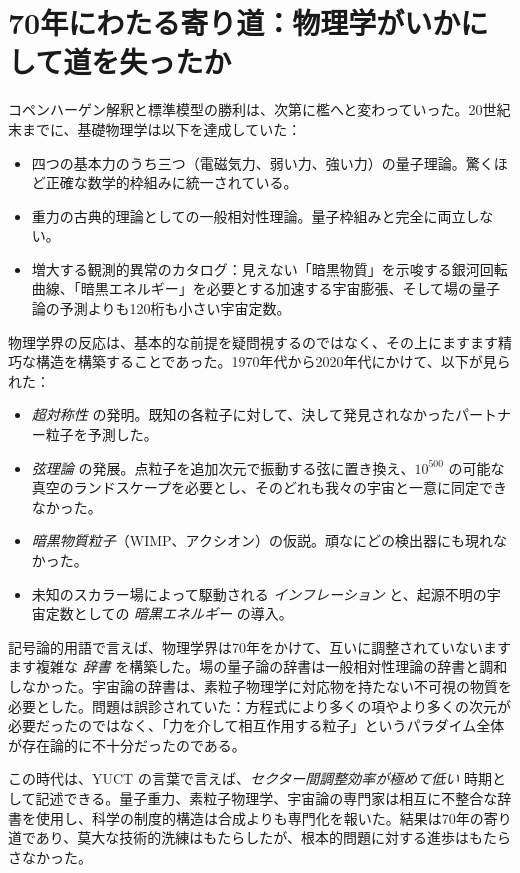 \documentclass[12pt,a4paper]{article}
\begin{document}
	\section{70年にわたる寄り道：物理学がいかにして道を失ったか}
	
	コペンハーゲン解釈と標準模型の勝利は、次第に檻へと変わっていった。20世紀末までに、基礎物理学は以下を達成していた：
	\begin{itemize}
		\item 四つの基本力のうち三つ（電磁気力、弱い力、強い力）の量子理論。驚くほど正確な数学的枠組みに統一されている。
		\item 重力の古典的理論としての一般相対性理論。量子枠組みと完全に両立しない。
		\item 増大する観測的異常のカタログ：見えない「暗黒物質」を示唆する銀河回転曲線、「暗黒エネルギー」を必要とする加速する宇宙膨張、そして場の量子論の予測よりも120桁も小さい宇宙定数。
	\end{itemize}
	
	物理学界の反応は、基本的な前提を疑問視するのではなく、その上にますます精巧な構造を構築することであった。1970年代から2020年代にかけて、以下が見られた：
	\begin{itemize}
		\item \emph{超対称性} の発明。既知の各粒子に対して、決して発見されなかったパートナー粒子を予測した。
		\item \emph{弦理論} の発展。点粒子を追加次元で振動する弦に置き換え、\(10^{500}\) の可能な真空のランドスケープを必要とし、そのどれも我々の宇宙と一意に同定できなかった。
		\item \emph{暗黒物質粒子}（WIMP、アクシオン）の仮説。頑なにどの検出器にも現れなかった。
		\item 未知のスカラー場によって駆動される \emph{インフレーション} と、起源不明の宇宙定数としての \emph{暗黒エネルギー} の導入。
	\end{itemize}
	
	記号論的用語で言えば、物理学界は70年をかけて、互いに調整されていないますます複雑な \emph{辞書} を構築した。場の量子論の辞書は一般相対性理論の辞書と調和しなかった。宇宙論の辞書は、素粒子物理学に対応物を持たない不可視の物質を必要とした。問題は誤診されていた：方程式により多くの項やより多くの次元が必要だったのではなく、「力を介して相互作用する粒子」というパラダイム全体が存在論的に不十分だったのである。
	
	この時代は、YUCT の言葉で言えば、\emph{セクター間調整効率が極めて低い} 時期として記述できる。量子重力、素粒子物理学、宇宙論の専門家は相互に不整合な辞書を使用し、科学の制度的構造は合成よりも専門化を報いた。結果は70年の寄り道であり、莫大な技術的洗練はもたらしたが、根本的問題に対する進歩はもたらさなかった。
	
\end{document}
